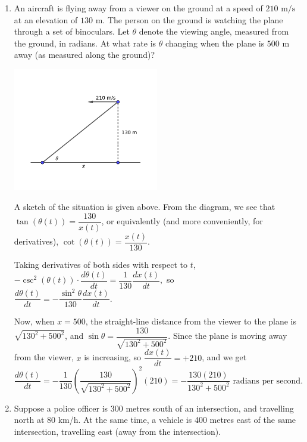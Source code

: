 \documentclass[12pt]{article}
\begin{document}
\newpage


\begin{enumerate}
\item An aircraft is flying away from a viewer on the ground at a speed of $210 \text{ m/s}$ at an elevation of $130 \text{ m}$. The person on the ground is watching the plane through a set of binoculars. Let $\theta$ denote the viewing angle, measured from the ground, in radians. At what rate is $\theta$ changing when the plane is $500 \text{ m}$ away (as measured along the ground)?

\begin{center}
\includegraphics[width=0.5\textwidth]{Tut7-2sol}
\end{center}




A sketch of the situation is given above. From the diagram, we see that $\tan(\theta(t)) = \dfrac{130}{x(t)}$, or equivalently (and more conveniently, for derivatives), $\cot(\theta(t)) = \dfrac{x(t)}{130}$.

Taking derivatives of both sides with respect to $t$,
$
-\csc^2(\theta(t))\cdot \dfrac{d\theta(t)}{dt} = \dfrac{1}{130}\dfrac{dx(t)}{dt},
$
so \\$\dfrac{d\theta(t)}{dt} = -\dfrac{\sin^2\theta}{130}\dfrac{dx(t)}{dt}$.

Now, when $x=500$, the straight-line distance from the viewer to the plane is $\sqrt{130^2+500^2}$, and $\sin\theta = \dfrac{130}{\sqrt{130^2+500^2}}$.
Since the plane is moving away from the viewer, $x$ is increasing, so $\dfrac{dx(t)}{dt} = +210$, and we get
\[
\frac{d\theta(t)}{dt} = -\frac{1}{130}\left(\frac{130}{\sqrt{130^2+500^2}}\right)^2(210) = -\frac{130(210)}{130^2+500^2} \text{ radians per second}.
\]

\newpage

\item Suppose a police officer is 300 metres south of an intersection, and travelling north at 80 km/h. At the same time, a vehicle is 400 metres east of the same intersection, travelling east (away from the intersection). 


\end{enumerate}
\end{document}
